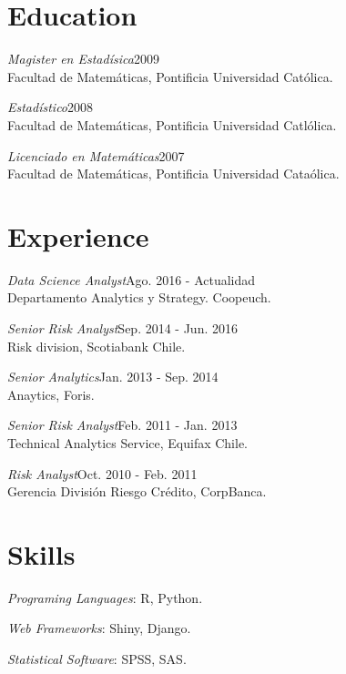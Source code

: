 \documentclass[margin]{res}
\begin{document}
\begin{resume}

\section{Education}

    {\sl Magister en Estadísica}\hfill 2009\\
    Facultad de Matemáticas, Pontificia Universidad Católica.

    {\sl Estadístico}\hfill 2008\\
    Facultad de Matemáticas, Pontificia Universidad Catlólica.

    {\sl Licenciado en Matemáticas}\hfill 2007\\
    Facultad de Matemáticas, Pontificia Universidad Cataólica.

\vspace{1cm}

\section{Experience}

     {\sl Data Science Analyst}\hfill Ago. 2016 - Actualidad\\
        Departamento Analytics y Strategy. Coopeuch.

    {\sl Senior Risk Analyst}\hfill Sep. 2014 - Jun. 2016\\
        Risk division, Scotiabank Chile.

    {\sl Senior Analytics}\hfill Jan. 2013 - Sep. 2014\\
    Anaytics, Foris.

    {\sl Senior Risk Analyst}\hfill Feb. 2011 - Jan. 2013\\
    Technical Analytics Service, Equifax Chile.

    {\sl Risk Analyst}\hfill Oct. 2010 - Feb. 2011\\
    Gerencia División Riesgo Crédito, CorpBanca.

\vspace{1cm}

\section{Skills}

    {\sl Programing Languages}: R, Python.

    {\sl Web Frameworks}: Shiny, Django.

    {\sl Statistical Software}: SPSS, SAS.
    

\end{resume}
\end{document}
